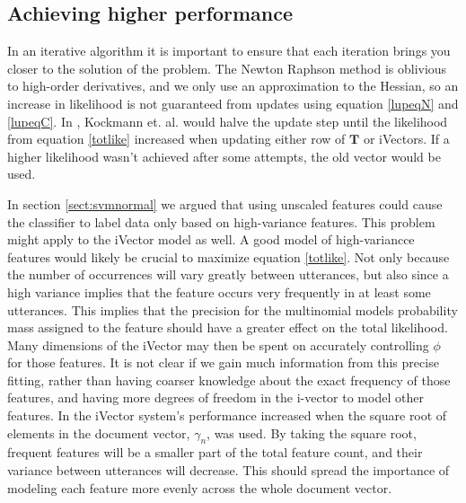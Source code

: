\subsection{Achieving higher performance}
\label{sect:higherlike}

In an iterative algorithm it is important to ensure that each iteration brings you closer to the solution of the problem. The Newton Raphson method is oblivious to high-order derivatives, and we only use an approximation to the Hessian, so an increase in likelihood is not guaranteed from updates using equation \ref{lupeqN} and \ref{lupeqC}. In \cite{kockmann2010prosodic}, Kockmann et. al. would halve the update step until the likelihood from equation \ref{totlike} increased when updating either row of $\mathbf{T}$ or iVectors. If a higher likelihood wasn't achieved after some attempts, the old vector would be used.  

In section \ref{sect:svmnormal} we argued that using unscaled features could cause the classifier to label data only based on high-variance features. This problem might apply to the iVector model as well. A good model of high-variancce features would likely be crucial to maximize equation \ref{totlike}. Not only because the number of occurrences will vary greatly between utterances, but also since a high variance implies that the feature occurs very frequently in at least some utterances. This implies that the precision for the multinomial models probability mass assigned to the feature should have a greater effect on the total likelihood. Many dimensions of the iVector may then be spent on accurately controlling $\phi$ for those features. It is not clear if we gain much information from this precise fitting, rather than having coarser knowledge about the exact frequency of those features, and having more degrees of freedom in the i-vector to model other features. In \cite{soufifar2011ivector} the iVector system's performance increased when the square root of elements in the document vector, $\gamma_n$, was used. By taking the square root, frequent features will be a smaller part of the total feature count, and their variance between utterances will decrease. This should spread the importance of modeling each feature more evenly across the whole document vector.

